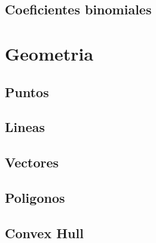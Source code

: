 \subsection{Coeficientes binomiales}
\raggedbottom
\hrulefill

\section{Geometria}
\subsection{Puntos}
\raggedbottom
\hrulefill
\subsection{Lineas}
\raggedbottom
\hrulefill
\subsection{Vectores}
\raggedbottom
\hrulefill
\subsection{Poligonos}
\raggedbottom
\hrulefill
\subsection{Convex Hull}
\raggedbottom
\hrulefill

